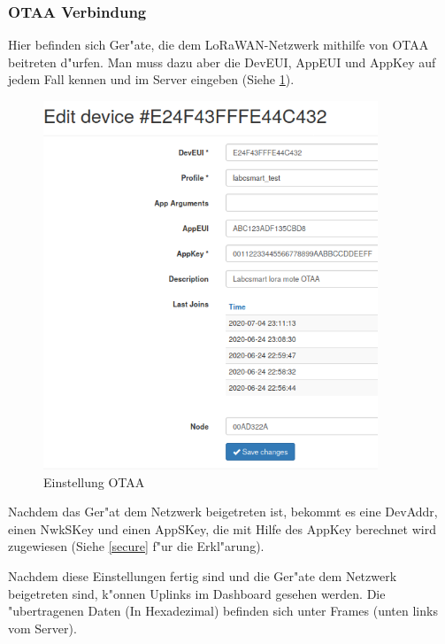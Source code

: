 \vspace{10cm}
\subsubsection{OTAA Verbindung}
Hier befinden sich Ger"ate, die dem LoRaWAN-Netzwerk mithilfe von OTAA
beitreten d"urfen. Man muss dazu aber die DevEUI, AppEUI und AppKey auf
jedem Fall kennen und im Server eingeben (Siehe \ref{fig:otaa}). 
	\begin{figure}[h]
	\centering
	\includegraphics[width=10cm]{source/images/Labcsmart_otaa_gen}
	\caption{Einstellung OTAA\label{fig:otaa}}
\end{figure}
Nachdem das Ger"at dem Netzwerk beigetreten ist, bekommt es eine
DevAddr, einen NwkSKey und einen AppSKey, die mit Hilfe des AppKey
berechnet wird zugewiesen (Siehe \ref{secure} f"ur die Erkl"arung). 
\vspace{10cm}

Nachdem diese Einstellungen fertig sind und die Ger"ate dem Netzwerk
beigetreten sind, k"onnen Uplinks im Dashboard gesehen werden. Die
"ubertragenen Daten (In Hexadezimal) befinden sich unter Frames 
(unten links vom Server). 

